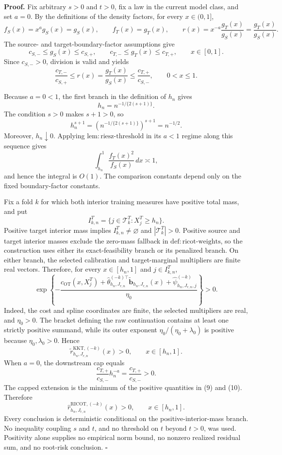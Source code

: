 \textbf{Proof.}
Fix arbitrary \(s>0\) and \(t>0\), fix a law in the current model class, and set \(a=0\). By the definitions of the density factors, for every \(x\in(0,1]\),
\[
f_S(x)=x^ag_S(x)=g_S(x),
\qquad
f_T(x)=g_T(x),
\qquad
r(x)=x^{-a}\frac{g_T(x)}{g_S(x)}=\frac{g_T(x)}{g_S(x)}.
\tag{1}
\]
The source- and target-boundary-factor assumptions give
\[
c_{S,-}\le g_S(x)\le c_{S,+},
\qquad
c_{T,-}\le g_T(x)\le c_{T,+},
\qquad x\in[0,1].
\tag{2}
\]
Since \(c_{S,-}>0\), division is valid and yields
\[
\frac{c_{T,-}}{c_{S,+}}
\le r(x)=\frac{g_T(x)}{g_S(x)}
\le \frac{c_{T,+}}{c_{S,-}},
\qquad 0<x\le1.
\tag{3}
\]

Because \(a=0<1\), the first branch in the definition of \(h_n\) gives
\[
h_n=n^{-1/\{2(s+1)\}}.
\tag{4}
\]
The condition \(s>0\) makes \(s+1>0\), so
\[
h_n^{s+1}
=\left(n^{-1/\{2(s+1)\}}\right)^{s+1}
=n^{-1/2}.
\tag{5}
\]
Moreover, \(h_n\downarrow0\). Applying \(\mathrm{lem:riesz\text{-}threshold}\) in its \(a<1\) regime along this sequence gives
\[
\int_{h_n}^1\frac{f_T(x)^2}{f_S(x)}\,dx\asymp1,
\tag{6}
\]
and hence the integral is \(O(1)\). The comparison constants depend only on the fixed boundary-factor constants.

Fix a fold \(k\) for which both interior training measures have positive total mass, and put
\[
I^T_{k,n}=\{j\in\mathcal T^T_k:X_j^T\ge h_n\}.
\tag{7}
\]
Positive target interior mass implies \(I^T_{k,n}\ne\varnothing\) and \(|\mathcal T^T_k|>0\). Positive source and target interior masses exclude the zero-mass fallback in \(\mathrm{def:ricot\text{-}weights}\), so the construction uses either its exact-feasibility branch or its penalized branch. On either branch, the selected calibration and target-marginal multipliers are finite real vectors. Therefore, for every \(x\in[h_n,1]\) and \(j\in I^T_{k,n}\),
\[
\exp\!\left\{-\frac{c_{\mathrm{OT}}(x,X_j^T)
+\widehat\theta_{h_n,J_{r,n}}^{(-k)\top}
\widetilde{\mathbf b}_{h_n,J_{r,n}}(x)
+\widehat\psi^{(-k)}_{h_n,J_{r,n},j}}{\eta_0}\right\}>0.
\tag{8}
\]
Indeed, the cost and spline coordinates are finite, the selected multipliers are real, and \(\eta_0>0\). The bracket defining the raw continuation contains at least one strictly positive summand, while its outer exponent \(\eta_0/(\eta_0+\lambda_0)\) is positive because \(\eta_0,\lambda_0>0\). Hence
\[
\widetilde r^{\mathrm{KKT},(-k)}_{h_n,J_{r,n}}(x)>0,
\qquad x\in[h_n,1].
\tag{9}
\]
When \(a=0\), the downstream cap equals
\[
\frac{c_{T,+}}{c_{S,-}}h_n^{-a}=\frac{c_{T,+}}{c_{S,-}}>0.
\tag{10}
\]
The capped extension is the minimum of the positive quantities in (9) and (10). Therefore
\[
\widehat r^{\mathrm{RICOT},(-k)}_{h_n,J_{r,n}}(x)>0,
\qquad x\in[h_n,1].
\tag{11}
\]
Every conclusion is deterministic conditional on the positive-interior-mass branch. No inequality coupling \(s\) and \(t\), and no threshold on \(t\) beyond \(t>0\), was used. Positivity alone supplies no empirical norm bound, no nonzero realized residual sum, and no root-risk conclusion. \(\square\)